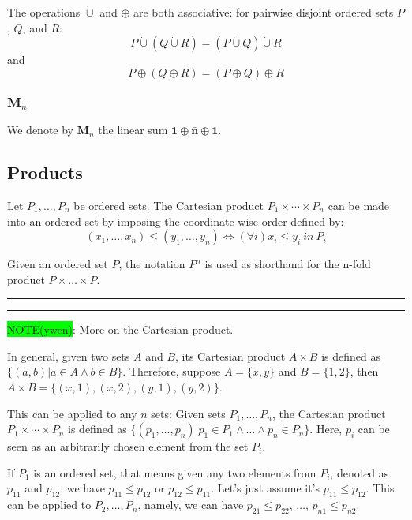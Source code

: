 \documentclass[12pt, letterpaper, oneside]{book}
\begin{document}
The operations $\dot{\cup}$ and $\oplus$ are both associative: for pairwise disjoint ordered sets $P$, $Q$, and $R$:
\[P \dot{\cup} (Q \dot{\cup} R) = (P \dot{\cup} Q) \dot{\cup} R\]
and
\[P \oplus (Q \oplus R) = (P \oplus Q) \oplus R\]

\subsubsection{$\mathbf{M}_n$}

We denote by $\mathbf{M}_n$ the linear sum $\mathbf{1} \oplus \bar{\mathbf{n}} \oplus \mathbf{1}$.

\subsection{Products} \label{ch01-products}

Let $P_1, \ldots, P_n$ be ordered sets. The Cartesian product $P_1 \times \cdots \times P_n$ can be made into an ordered
set by imposing the coordinate-wise order defined by:
\[
  (x_1, \ldots, x_n) \leqslant (y_1, \ldots, y_n) \Leftrightarrow (\forall i) x_i \leqslant y_i \ in \ P_i
\]

Given an ordered set $P$, the notation $P^n$ is used as shorthand for the n-fold product $P \times \ldots \times P$.

\noindent\rule[-9pt]{1cm}{10pt}\rule{10cm}{0.4pt}

\colorbox{lime}{NOTE(ywen)}: More on the Cartesian product.

In general, given two sets $A$ and $B$, its Cartesian product $A \times B$ is defined as $\{(a, b) | a \in A \land b \in B\}$.
Therefore, suppose $A = \{x, y\}$ and $B = \{1, 2\}$, then $A \times B = \{(x, 1), (x, 2), (y, 1), (y, 2)\}$.

This can be applied to any $n$ sets: Given sets $P_1, \ldots, P_n$, the Cartesian product $P_1 \times \cdots \times P_n$
is defined as $\{(p_1, \ldots, p_n) | p_1 \in P_1 \land \ldots \land p_n \in P_n\}$. Here, $p_i$ can be seen as an
arbitrarily chosen element from the set $P_i$.

If $P_1$ is an ordered set, that means given any two elements from $P_i$, denoted as $p_{11}$ and $p_{12}$, we have
$p_{11} \leqslant p_{12}$ or $p_{12} \leqslant p_{11}$. Let's just assume it's $p_{11} \leqslant p_{12}$. This can be
applied to $P_2, \ldots, P_n$, namely, we can have $p_{21} \leqslant p_{22}$, $\ldots$, $p_{n1} \leqslant p_{n2}$.
\end{document}
